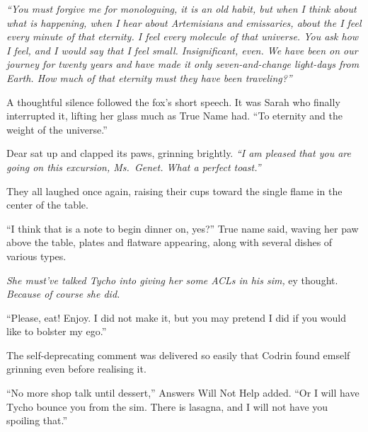 \emph{``You must forgive me for monologuing, it is an old habit, but when I think about what is happening, when I hear about Artemisians and emissaries, about the I feel every minute of that eternity. I feel every molecule of that universe. You ask how I feel, and I would say that I feel small. Insignificant, even. We have been on our journey for twenty years and have made it only seven-and-change light-days from Earth. How much of that eternity must they have been traveling?''}

A thoughtful silence followed the fox's short speech. It was Sarah who finally interrupted it, lifting her glass much as True Name had. ``To eternity and the weight of the universe.''

Dear sat up and clapped its paws, grinning brightly. \emph{``I am pleased that you are going on this excursion, Ms.~Genet. What a perfect toast.''}

They all laughed once again, raising their cups toward the single flame in the center of the table.

``I think that is a note to begin dinner on, yes?'' True name said, waving her paw above the table, plates and flatware appearing, along with several dishes of various types.

\emph{She must've talked Tycho into giving her some ACLs in his sim,} ey thought. \emph{Because of course she did.}

``Please, eat! Enjoy. I did not make it, but you may pretend I did if you would like to bolster my ego.''

The self-deprecating comment was delivered so easily that Codrin found emself grinning even before realising it.

``No more shop talk until dessert,'' Answers Will Not Help added. ``Or I will have Tycho bounce you from the sim. There is lasagna, and I will not have you spoiling that.''
